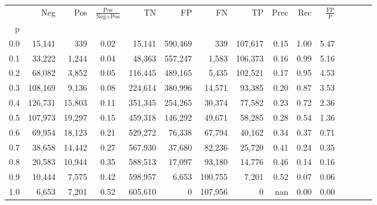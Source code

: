 \begin{tabular}{rrrcrrrrrrrrrrr}
\toprule
{} &      Neg &     Pos & $\frac{\text{Pos}}{\text{Neg}+\text{Pos}}$ &       TN &       FP &       FN &       TP &  Prec &   Rec & $\frac{\text{FP}}{\text{P}}$ \\
p   &          &         &                                            &          &          &          &          &       &       &                              \\
\midrule
0.0 &   15,141 &     339 &                                       0.02 &   15,141 &  590,469 &      339 &  107,617 &  0.15 &  1.00 &                         5.47 \\
0.1 &   33,222 &   1,244 &                                       0.04 &   48,363 &  557,247 &    1,583 &  106,373 &  0.16 &  0.99 &                         5.16 \\
0.2 &   68,082 &   3,852 &                                       0.05 &  116,445 &  489,165 &    5,435 &  102,521 &  0.17 &  0.95 &                         4.53 \\
0.3 &  108,169 &   9,136 &                                       0.08 &  224,614 &  380,996 &   14,571 &   93,385 &  0.20 &  0.87 &                         3.53 \\
0.4 &  126,731 &  15,803 &                                       0.11 &  351,345 &  254,265 &   30,374 &   77,582 &  0.23 &  0.72 &                         2.36 \\
0.5 &  107,973 &  19,297 &                                       0.15 &  459,318 &  146,292 &   49,671 &   58,285 &  0.28 &  0.54 &                         1.36 \\
0.6 &   69,954 &  18,123 &                                       0.21 &  529,272 &   76,338 &   67,794 &   40,162 &  0.34 &  0.37 &                         0.71 \\
0.7 &   38,658 &  14,442 &                                       0.27 &  567,930 &   37,680 &   82,236 &   25,720 &  0.41 &  0.24 &                         0.35 \\
0.8 &   20,583 &  10,944 &                                       0.35 &  588,513 &   17,097 &   93,180 &   14,776 &  0.46 &  0.14 &                         0.16 \\
0.9 &   10,444 &   7,575 &                                       0.42 &  598,957 &    6,653 &  100,755 &    7,201 &  0.52 &  0.07 &                         0.06 \\
1.0 &    6,653 &   7,201 &                                       0.52 &  605,610 &        0 &  107,956 &        0 &   nan &  0.00 &                         0.00 \\
\bottomrule
\end{tabular}
